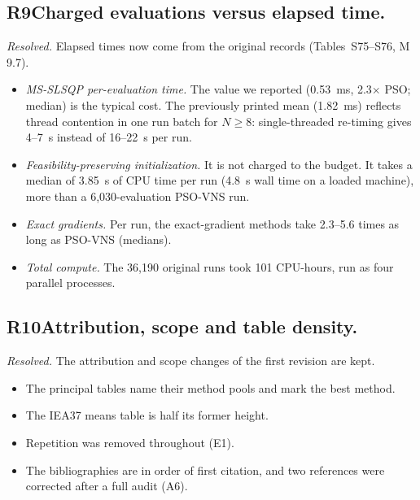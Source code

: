 \documentclass[11pt,a4paper]{article}
\newcommand{\concern}[2]{\subsection*{#1\quad #2}}
\begin{document}
\concern{R9}{Charged evaluations versus elapsed time.}
\emph{Resolved.} Elapsed times now come from the original records (Tables~S75--S76, M 9.7).
\begin{itemize}
\item \emph{MS-SLSQP per-evaluation time.} The value we reported (0.53~ms, 2.3$\times$ PSO; median) is the typical
cost. The previously printed mean (1.82~ms) reflects thread contention in one run batch for $N\ge8$: single-threaded
re-timing gives 4--7~s instead of 16--22~s per run.
\item \emph{Feasibility-preserving initialization.} It is not charged to the budget. It takes a median of 3.85~s of CPU
time per run (4.8~s wall time on a loaded machine), more than a 6,030-evaluation PSO-VNS run.
\item \emph{Exact gradients.} Per run, the exact-gradient methods take 2.3--5.6 times as long as PSO-VNS (medians).
\item \emph{Total compute.} The 36,190 original runs took 101 CPU-hours, run as four parallel processes.
\end{itemize}

\concern{R10}{Attribution, scope and table density.}
\emph{Resolved.} The attribution and scope changes of the first revision are kept.
\begin{itemize}
\item The principal tables name their method pools and mark the best method.
\item The IEA37 means table is half its former height.
\item Repetition was removed throughout (E1).
\item The bibliographies are in order of first citation, and two references were corrected after a full audit (A6).
\end{itemize}
\end{document}
